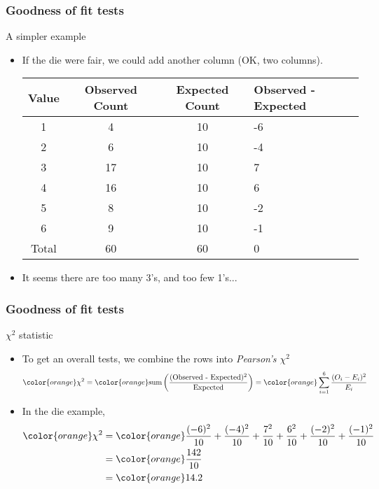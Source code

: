 \documentclass[handout]{beamer}
\begin{document}

   \begin{frame} \frametitle{Goodness of fit tests}

   \begin{block}
   {A simpler example}
   \begin{itemize}
   \item If the die were fair, we could add another column (OK, two columns).

     \begin{tabular}{c|c|c|p{1in}}
       {\small Value} & {\small Observed Count} & {\small Expected Count} & {\small Observed - Expected} \\ \hline
       1 & 4 & 10 & -6  \\
       2 & 6 & 10 & -4 \\
       3 & 17 & 10 & 7 \\
       4 & 16 & 10 & 6 \\
       5 & 8 & 10 & -2 \\
       6 & 9 & 10 & -1 \\ \hline
       Total & 60 & 60 & 0 \\
     \end{tabular}

     \item It seems there are too many 3's, and too few 1's...

   \end{itemize}
   \end{block}
   \end{frame}


   \begin{frame} \frametitle{Goodness of fit tests}

   \begin{block}
   {$\chi^2$ statistic}
   \begin{itemize}
   \item To get an overall tests, we combine the rows into {\em Pearson's $\chi^2$}
     $$
     \begin{aligned}
     {\color{orange} \chi^2} &= {\color{orange} \text{sum} \left(\frac{\text{(Observed - Expected)$^2$}}{\text{Expected}}\right)} = {\color{orange} \sum_{i=1}^6 \frac{(O_i - E_i)^2}{E_i}}
     \end{aligned}
     $$

     \item In the die example,
       $$
       \begin{aligned}
       {\color{orange} \chi^2} &= {\color{orange} \frac{(-6)^2}{10} + \frac{(-4)^2}{10} + \frac{7^2}{10} + \frac{6^2}{10} + \frac{(-2)^2}{10} + \frac{(-1)^2}{10}} \\
       &= {\color{orange} \frac{142}{10}} \\
       &= {\color{orange} 14.2}
       \end{aligned}
       $$

   \end{itemize}
   \end{block}
   \end{frame}
\end{document}
